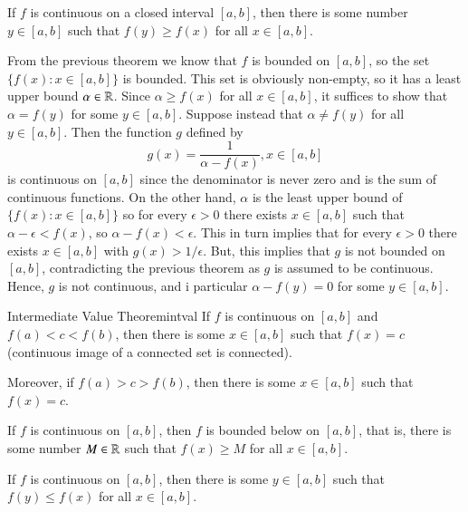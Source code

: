 \documentclass[12pt]{report}
\begin{document}
\begin{thm}{}{}
    If $f$ is continuous on a closed interval $[a,b]$, then there is some number $y \in [a,b]$ such that $f(y) \geq f(x)$ for all $x \in [a,b]$.
\end{thm}
\begin{proof*}{}{}
    From the previous theorem we know that $f$ is bounded on $[a,b]$, so the set $\{f(x):x\in[a,b]\}$ is bounded. This set is obviously non-empty, so it has a least upper bound $\alpha \in \mathbb R$. Since $\alpha \geq f(x)$ for all $x \in [a,b]$, it suffices to show that $\alpha = f(y)$ for some $y \in [a,b]$. Suppose instead that $\alpha \neq f(y)$ for all $y \in [a,b]$. Then the function $g$ defined by $$g(x) = \frac{1}{\alpha - f(x)}, x \in [a,b]$$ is continuous on $[a,b]$ since the denominator is never zero and is the sum of continuous functions. On the other hand, $\alpha$ is the least upper bound of $\{f(x):x\in [a,b]\}$ so for every $\epsilon > 0$ there exists $x \in [a,b]$ such that $\alpha - \epsilon < f(x)$, so $\alpha - f(x) < \epsilon$. This in turn implies that for every $\epsilon > 0$ there exists $x \in [a,b]$ with $g(x) > 1/\epsilon$. But, this implies that $g$ is not bounded on $[a,b]$, contradicting the previous theorem as $g$ is assumed to be continuous. Hence, $g$ is not continuous, and i particular $\alpha - f(y) = 0$ for some $y \in [a,b]$.
\end{proof*}


\begin{namthm}{Intermediate Value Theorem}{intval}
    If $f$ is continuous on $[a,b]$ and $f(a) < c < f(b)$, then there is some $x \in [a,b]$ such that $f(x) = c$ (continuous image of a connected set is connected).

    Moreover, if $f(a) > c > f(b)$, then there is some $x \in [a,b]$ such that $f(x) = c$.
\end{namthm}

\begin{thm}{}{}
    If $f$ is continuous on $[a,b]$, then $f$ is bounded below on $[a,b]$, that is, there is some number $M \in \mathbb R$ such that $f(x) \geq M$ for all $x \in [a,b]$.
\end{thm}

\begin{thm}{}{}
    If $f$ is continuous on $[a,b]$, then there is some $y \in [a,b]$ such that $f(y) \leq f(x)$ for all $x \in [a,b]$.
\end{thm}
\end{document}
